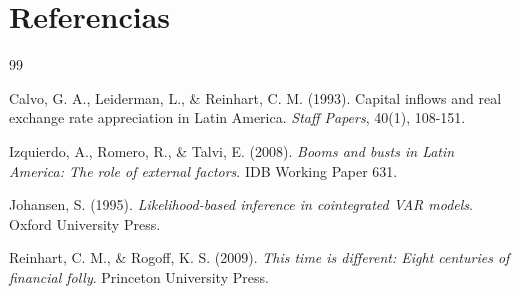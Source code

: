 \documentclass[3p,11pt]{elsarticle}
\begin{document}
\section*{Referencias}

\begin{thebibliography}{99}

Calvo, G. A., Leiderman, L., \& Reinhart, C. M. (1993). Capital inflows and real exchange rate appreciation in Latin America. \textit{Staff Papers}, 40(1), 108-151.

Izquierdo, A., Romero, R., \& Talvi, E. (2008). \textit{Booms and busts in Latin America: The role of external factors}. IDB Working Paper 631.

Johansen, S. (1995). \textit{Likelihood-based inference in cointegrated VAR models}. Oxford University Press.

Reinhart, C. M., \& Rogoff, K. S. (2009). \textit{This time is different: Eight centuries of financial folly}. Princeton University Press.

\end{thebibliography}
\end{document}
